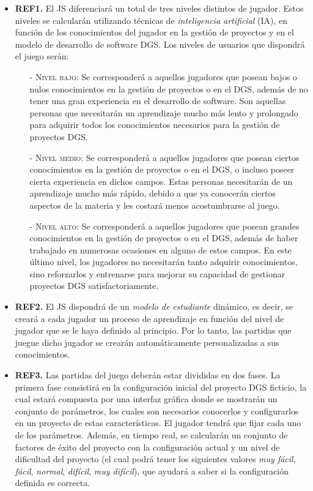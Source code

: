 \begin{itemize}
	\item \textbf{REF1.} El JS diferenciará un total de tres niveles distintos de jugador. Estos niveles se calcularán utilizando técnicas de \emph{inteligencia artificial} (IA), en función de los conocimientos del jugador en la gestión de proyectos y en el modelo de desarrollo de software DGS. Los niveles de usuarios que dispondrá el juego serán:
	\begin{itemize}
		\item[-] \textsc{Nivel bajo:} Se corresponderá a aquellos jugadores que posean bajos o nulos conocimientos en la gestión de proyectos o en el DGS, además de no tener una gran experiencia en el desarrollo de software. Son aquellas personas que necesitarán un aprendizaje mucho más lento y prolongado para adquirir todos los conocimientos necesarios para la gestión de proyectos DGS.
		\item[-] \textsc{Nivel medio:} Se corresponderá a aquellos jugadores que posean ciertos conocimientos en la gestión de proyectos o en el DGS, o incluso poseer cierta experiencia en dichos campos. Estas personas necesitarán de un aprendizaje mucho más rápido, debido a que ya conocerán ciertos aspectos de la materia y les costará menos acostumbrarse al juego.
		\item[-] \textsc{Nivel alto:} Se corresponderá a aquellos jugadores que posean grandes conocimientos en la gestión de proyectos o en el DGS, además de haber trabajado en numerosas ocasiones en alguno de estos campos. En este último nivel, los jugadores no necesitarán tanto adquirir conocimientos, sino reforzarlos y entrenarse para mejorar su capacidad de gestionar proyectos DGS satisfactoriamente.
	\end{itemize}
	
	\item \textbf{REF2.} El JS dispondrá de un \emph{modelo de estudiante} dinámico, es decir, se creará a cada jugador un proceso de aprendizaje en función del nivel de jugador que se le haya definido al principio. Por lo tanto, las partidas que juegue dicho jugador se crearán automáticamente personalizadas a sus conocimientos.
	
	\item \textbf{REF3.} Las partidas del juego deberán estar divididas en dos fases. La primera fase consistirá en la configuración inicial del proyecto DGS ficticio, la cual estará compuesta por una interfaz gráfica donde se mostrarán un conjunto de parámetros, los cuales son necesarios conocerlos y configurarlos en un proyecto de estas características. El jugador tendrá que fijar cada uno de los parámetros. Además, en tiempo real, se calcularán un conjunto de factores de éxito del proyecto con la configuración actual y un nivel de dificultad del proyecto (el cual podrá tener los siguientes valores \emph{muy fácil}, \emph{fácil}, \emph{normal}, \emph{difícil}, \emph{muy difícil}), que ayudará a saber si la configuración definida es correcta.
	

\end{itemize}
